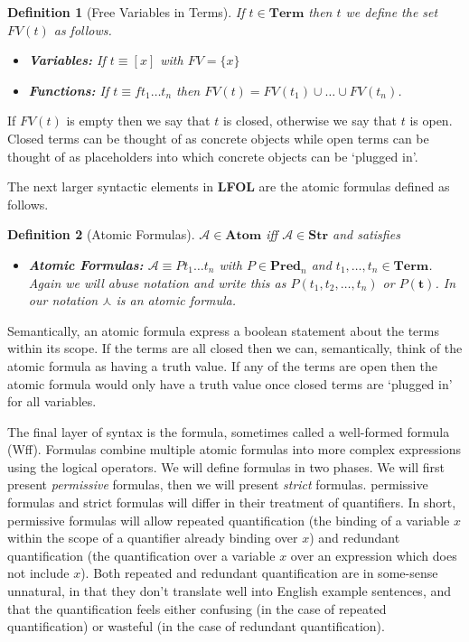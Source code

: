 \documentclass[12pt]{article}
\theoremstyle{break}
\newtheorem{definition}{Definition}[section]
\theoremstyle{break}
\theoremstyle{break}
\theoremstyle{break}
\newcommand{\bv}[1]{\boldsymbol{#1}}
\newcommand{\mc}[1]{\mathcal{#1}}
\begin{document}
\begin{definition}[Free Variables in Terms]
If $t\in \textbf{Term}$ then $t$ we define the set $FV(t)$ as follows.
\begin{itemize}
\item{\textbf{Variables:} If $t\equiv [x]$ with $FV = \{x\}$}
\item{\textbf{Functions:} If $t\equiv ft_1\ldots t_n$ then $FV(t) = FV(t_1)\cup\ldots \cup FV(t_n)$.}
\end{itemize}
\end{definition}

If $FV(t)$ is empty then we say that $t$ is closed, otherwise we say that $t$ is open.
Closed terms can be thought of as concrete objects while open terms can be thought of as placeholders into which concrete objects can be `plugged in'.

The next larger syntactic elements in \textbf{LFOL} are the atomic formulas defined as follows.

\begin{definition}[Atomic Formulas]
$\mc{A} \in \textbf{Atom}$ iff $\mc{A} \in \textbf{Str}$ and satisfies

\begin{itemize}
\item{\textbf{Atomic Formulas:} $\mc{A} \equiv Pt_1\ldots t_n$ with $P\in \textbf{Pred}_n$ and $t_1, \ldots, t_n \in \textbf{Term}$. Again we will abuse notation and write this as $P(t_1,t_2,\ldots,t_n)$ or $P(\bv{t})$. In our notation $\curlywedge$ is an atomic formula.}
\end{itemize}
\end{definition}

Semantically, an atomic formula express a boolean statement about the terms within its scope.
If the terms are all closed then we can, semantically, think of the atomic formula as having a truth value.
If any of the terms are open then the atomic formula would only have a truth value once closed terms are `plugged in' for all variables.

The final layer of syntax is the formula, sometimes called a well-formed formula  (Wff).
Formulas combine multiple atomic formulas into more complex expressions using the logical operators.
We will define formulas in two phases.
We will first present \textit{permissive} formulas, then we will present \textit{strict} formulas. 
permissive formulas and strict formulas will differ in their treatment of quantifiers.
In short, permissive formulas will allow repeated quantification (the binding of a variable $x$ within the scope of a quantifier already binding over $x$) and redundant quantification (the quantification over a variable $x$ over an expression which does not include $x$). 
Both repeated and redundant quantification are in some-sense unnatural, in that they don't translate well into English example sentences, and that the quantification feels either confusing (in the case of repeated quantification) or wasteful (in the case of redundant quantification).
\end{document}

